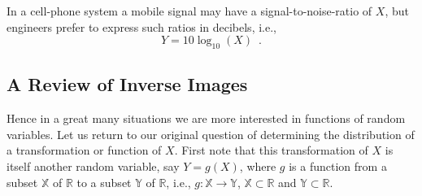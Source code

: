 \begin{example}\label{EgSignal2NoiseInDecibels10TimeslogBase10OfX}
In a cell-phone system a mobile signal may have a signal-to-noise-ratio of $X$, but engineers prefer to express such ratios in decibels, i.e.,
\[
Y = 10 \log_{10}(X) \enspace .
\]
\end{example}

\subsection{A Review of Inverse Images}\label{S:RWInverseImages}
Hence in a great many situations we are more interested in functions of random variables. 
Let us return to our original question of determining the distribution of a transformation or function of $X$.  
First note that this transformation of $X$ is itself another random variable, say $Y = g(X)$, 
where $g$ is a function from a subset $\mathbb{X}$ of $\mathbb{R}$ to a subset $\mathbb{Y}$ of $\mathbb{R}$, 
i.e., $g: \mathbb{X} \to \mathbb{Y}$, $\mathbb{X} \subset \mathbb{R}$ and $\mathbb{Y} \subset \mathbb{R}$.

